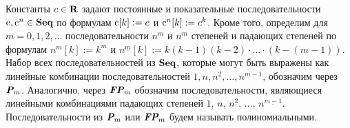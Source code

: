 Константы $c \in \text{\bf R}$ задают постоянные и показательные последовательности ${\rm c}, {\rm c}^n \in \text{\bf Seq}$ по формулам ${\rm c}[k] := c$ и ${\rm c}^n[k] := c^k$. Кроме того, определим для $m = 0,1,2,\ldots$ последовательности $n^m$ и $n^{\underline{m}}$ степеней и падающих степеней по формулам $n^m[k] := k^m$ и $n^{\underline{m}}[k] := k(k-1)(k-2)\cdot \ldots \cdot (k-(m-1)).$ Набор всех последовательностей из $\text{\bf Seq}$, которые могут быть выражены как линейные комбинации последовательностей $1, n, n^2, \ldots, n^{m-1}$, обозначим через $\text{\bfseries\itshape P}_m$. Аналогично, через $\text{\bfseries\itshape FP}_m$ обозначим последовательности, являющиеся линейными комбинациями падающих степеней $1$, $n$, $n^{\underline{2}}$, $\ldots$, $n^{\underline{m-1}}$. Последовательности из $\text{\bfseries\itshape P}_m$ или $\text{\bfseries\itshape FP}_m$ будем называть полиномиальными.
